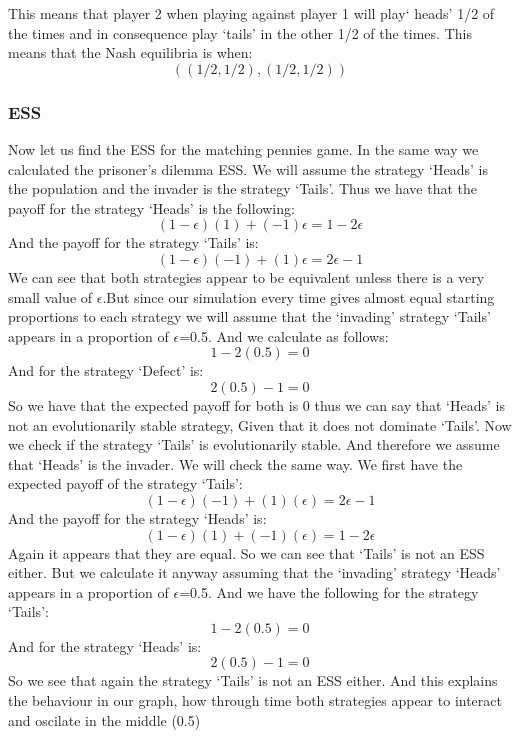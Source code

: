 \documentclass{book}
\begin{document}
This means that player 2 when playing against player 1 will play` heads'  1/2  of the times and in consequence play `tails' in the other 1/2 of the times. 
This means that the Nash equilibria is when:
\begin{equation}
((1/2, 1/2), (1/2, 1/2))
\end{equation}

\subsubsection{ESS}
Now let us find the ESS for the matching pennies game. In the same way we calculated the prisoner's dilemma ESS. We will assume the strategy  `Heads' is the population and the invader is the strategy `Tails'. Thus we have that the payoff for the strategy `Heads' is the following:
\begin{equation}
(1-{\epsilon})(1) + (-1){\epsilon} = 1 - 2{\epsilon}
\end{equation}
And the payoff for the strategy `Tails' is:
\begin{equation}
(1-{\epsilon})(-1) + (1){\epsilon} = 2{\epsilon} - 1
\end{equation}
We can see that both strategies appear to be equivalent unless there is a very small value of $\epsilon$.But since our simulation every time gives almost equal starting proportions to each strategy we will assume that the `invading' strategy `Tails' appears in a proportion of $\epsilon$=0.5. And we calculate as follows:
\begin{equation}
1- 2(0.5) = 0
\end{equation}
And for the strategy `Defect' is:
\begin{equation}
 2(0.5)- 1 = 0
\end{equation}
So we have that the expected payoff for both is 0 thus we can say that `Heads' is not an evolutionarily stable strategy, Given that it does not dominate `Tails'.
Now we check if the strategy `Tails' is evolutionarily stable. And therefore we assume that `Heads' is the invader. We will check the same way. We first have the expected payoff of the strategy `Tails':
\begin{equation}
(1-{\epsilon})(-1) + (1)({\epsilon}) = 2{\epsilon} -1
\end{equation}
And the payoff for the strategy `Heads' is:
\begin{equation}
(1-{\epsilon})(1) + (-1)({\epsilon}) =  1 - 2{\epsilon}
\end{equation}
Again it appears that they are equal. So we can see that `Tails' is not an ESS either. But we calculate it anyway assuming that the `invading' strategy `Heads' appears in a proportion of $\epsilon$=0.5. And we have the following for the strategy `Tails':
\begin{equation}
1 -  2(0.5) = 0
\end{equation}
And for the strategy `Heads' is:
\begin{equation}
 2(0.5) - 1 = 0
\end{equation}
So we see that again the strategy `Tails' is not an ESS either. And this explains the behaviour in our graph, how through time both strategies appear to interact and oscilate in the middle (0.5)
\end{document}
